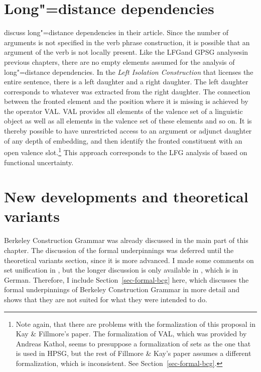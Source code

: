 \section{Long"=distance dependencies}

\mbox{}\citet[Section~3.10]{KF99a} discuss long"=distance dependencies in their article.
Since the number of arguments is not specified in the verb phrase construction, it is possible that an argument of the verb is not locally
present. Like the LFG\indexlfg and GPSG analyses\indexgpsg in previous chapters, there are no empty elements assumed
for the analysis of long"=distance dependencies.
 In the \emph{Left Isolation Construction} that licenses the entire sentence, there is a left daughter and a right daughter.
 The left daughter corresponds to whatever was extracted from the right daughter. The connection between the fronted element
 and the position where it is missing is achieved by the operator VAL.
 VAL provides all elements of the valence set of a linguistic object as well as all elements in the valence set of these elements and so on.
 It is thereby possible to have unrestricted access to an argument or adjunct daughter of any depth of embedding, and then identify the fronted
 constituent with an open valence slot.\footnote{
   Note again, that there are problems with the formalization of this proposal in Kay \& Fillmore's
   paper. The formalization of VAL, which was provided by Andreas Kathol, seems to presuppose a
   formalization of sets as the one that is used in HPSG, but the rest of Fillmore \& Kay's paper
   assumes a different formalization, which is inconsistent. See Section~\ref{sec-formal-bcg}.
 } This approach corresponds to the LFG analysis of \citet{KZ89a} based on functional uncertainty.%

\section{New developments and theoretical variants}

Berkeley Construction Grammar was already discussed in the main part of this chapter. The discussion
of the formal underpinnings was deferred until the theoretical variants section, since it is more
advanced. I made some comments on set unification in , but the longer
discussion is only available in , which is in
German. Therefore, I include Section~\ref{sec-formal-bcg} here, which discusses the formal
underpinnings of Berkeley Construction Grammar in more detail and shows that they are not suited for what they were intended to do.

